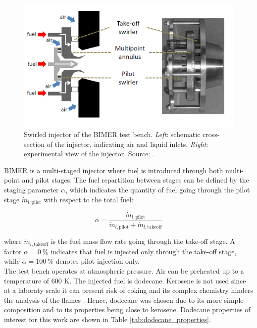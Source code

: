 \begin{figure}[h!]
	\centering
	\includegraphics[scale=0.5]{./part3_applications/figures_ch7_aero/BIMER_swirler}
	\caption[Swirled injector of the BIMER test bench]{Swirled injector of the BIMER test bench. \textsl{Left}: schematic cross-section of the injector, indicating air and liquid inlets. \textsl{Right}: experimental view of the injector. Source: .}
	\label{fig:BIMER_swirler}
\end{figure}

BIMER is a multi-staged injector where fuel is introduced through both multi-point and pilot stages. The fuel repartition between stages can be defined by the staging parameter $\alpha$, which indicates the quantity of fuel going through the pilot stage $\dot{m}_{l,\mathrm{pilot}}$ with respect to the total fuel:

\begin{equation}
\label{eq:BIMER_staging_parameter}
\alpha = \frac{\dot{m}_{l,\mathrm{pilot}}}{\dot{m}_{l,\mathrm{pilot}} + \dot{m}_{l,\mathrm{takeoff}}}
\end{equation}

where $\dot{m}_{l,\mathrm{takeoff}}$ is the fuel mass flow rate going through the take-off stage. A factor $\alpha = 0 ~\%$ indicates that fuel is injected only through the take-off stage, while $\alpha = 100 ~\%$ denotes pilot injection only. \\

The test bench operates at atmospheric pressure. Air can be preheated up to a temperature of $600$ K. The injected fuel is dodecane. Kerosene is not used since at a laboraty scale it can present risk of coking and its complex chemistry hinders the analysis of the flames . Hence, dodecane was chosen due to its more simple composition and to its properties being close to kerosene. Dodecane properties of interest for this work are shown in Table \ref{tab:dodecane_properties}.

